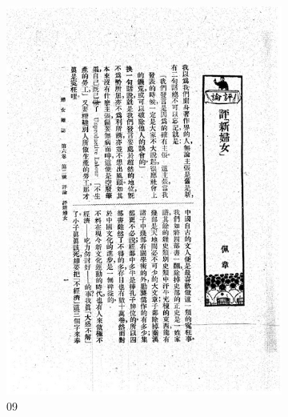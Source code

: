 \documentclass[12pt,twoside]{report}
\begin{document}
\begin{appendices}
\begin{figure}[htbp]
    \centering
    \begin{subfigure}[b]{0.23\linewidth}
        \includegraphics[width=\linewidth]{./figures/testset/09.jpg}
        \caption{09}
        \label{fig:test_09}
    \end{subfigure}
    \hfill
    \begin{subfigure}[b]{0.23\linewidth}

\end{subfigure}
\end{figure}
\end{appendices}
\end{document}
